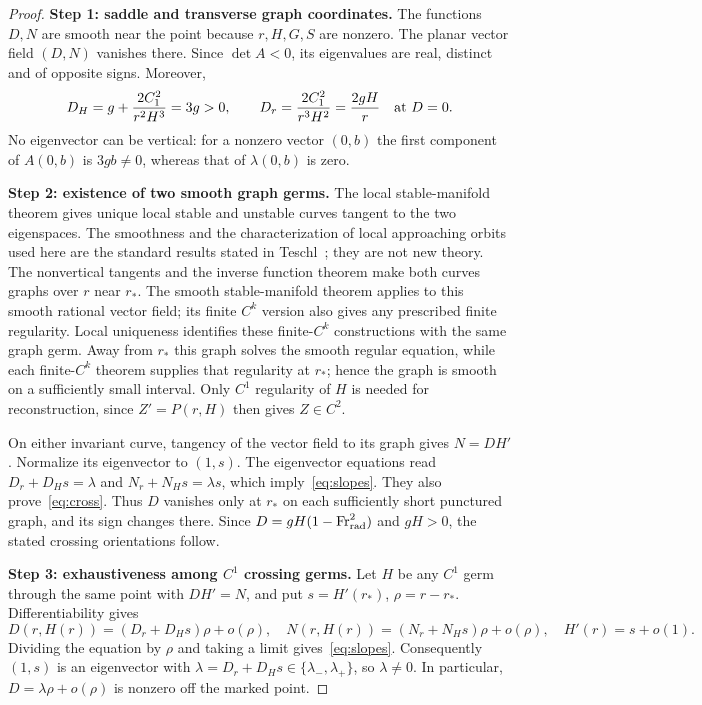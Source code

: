 \documentclass[11pt]{article}
\theoremstyle{remark}\newtheorem{remark}[theorem]{Remark}
\begin{document}
\begin{proof}
\textbf{Step 1: saddle and transverse graph coordinates.}
The functions $D,N$ are smooth near the point because $r,H,G,S$ are nonzero.
The planar vector field $(D,N)$ vanishes there. Since $\det A<0$, its
eigenvalues are real, distinct and of opposite signs. Moreover,
\[
D_H=g+\frac{2C_1^2}{r^2H^3}=3g>0,
\qquad D_r=\frac{2C_1^2}{r^3H^2}=\frac{2gH}{r}
\quad\hbox{at }D=0.
\]
No eigenvector can be vertical: for a nonzero vector $(0,b)$ the first
component of $A(0,b)$ is $3gb\ne0$, whereas that of $\lambda(0,b)$ is zero.

\textbf{Step 2: existence of two smooth graph germs.}
The local stable-manifold theorem gives unique local stable and unstable
curves tangent to the two eigenspaces. The smoothness and the characterization
of local approaching orbits used here are the standard results stated in
Teschl~\cite[Theorems 9.4--9.5, printed p.~259]{teschl}; they are not new
theory. The nonvertical tangents and the inverse function theorem make both
curves graphs over $r$ near $r_*$. The smooth stable-manifold theorem applies
to this smooth rational vector field; its finite $C^k$ version also gives any
prescribed finite regularity. Local uniqueness identifies these finite-$C^k$
constructions with the same graph germ. Away from $r_*$ this graph solves the
smooth regular equation, while each finite-$C^k$ theorem supplies that
regularity at $r_*$; hence the graph is smooth on a sufficiently small
interval. Only $C^1$ regularity of $H$ is needed for reconstruction, since
$Z'=P(r,H)$ then gives $Z\in C^2$.

On either invariant curve, tangency of the vector field to its graph gives
$N=DH'$. Normalize its eigenvector to $(1,s)$. The eigenvector equations read
$D_r+D_Hs=\lambda$ and $N_r+N_Hs=\lambda s$, which imply~\eqref{eq:slopes}.
They also prove~\eqref{eq:cross}. Thus $D$ vanishes only at $r_*$ on each
sufficiently short punctured graph, and its sign changes there. Since
$D=gH(1-\mathrm{Fr}_{\rm rad}^2)$ and $gH>0$, the stated crossing
orientations follow.

\textbf{Step 3: exhaustiveness among $C^1$ crossing germs.}
Let $H$ be any $C^1$ germ through the same point with $DH'=N$, and put
$s=H'(r_*)$, $\rho=r-r_*$. Differentiability gives
\[
D(r,H(r))=(D_r+D_Hs)\rho+o(\rho),\quad
N(r,H(r))=(N_r+N_Hs)\rho+o(\rho),\quad H'(r)=s+o(1).
\]
Dividing the equation by $\rho$ and taking a limit gives~\eqref{eq:slopes}.
Consequently $(1,s)$ is an eigenvector with
$\lambda=D_r+D_Hs\in\{\lambda_-,\lambda_+\}$, so $\lambda\ne0$.
In particular, $D=\lambda\rho+o(\rho)$ is nonzero off the marked point.


\end{proof}
\end{document}
